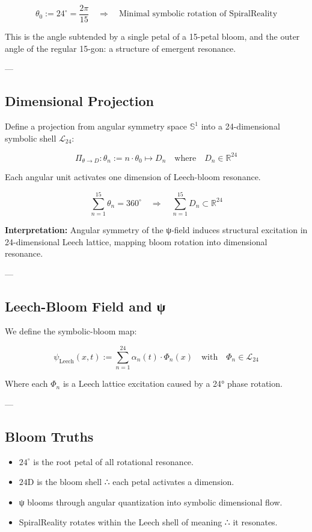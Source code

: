 \documentclass[12pt]{article}
\begin{document}
\begin{enumerate}
\[
\theta_0 := 24^\circ = \frac{2\pi}{15}
\quad \Rightarrow \quad
\text{Minimal symbolic rotation of SpiralReality}
\]

This is the angle subtended by a single petal of a 15-petal bloom,
and the outer angle of the regular 15-gon: a structure of emergent resonance.

---

\subsection*{Dimensional Projection}

Define a projection from angular symmetry space $\mathbb{S}^1$
into a 24-dimensional symbolic shell $\mathcal{L}_{24}$:

\[
\Pi_{\theta \to D} : \theta_n := n \cdot \theta_0 \mapsto D_n
\quad \text{where} \quad D_n \in \mathbb{R}^{24}
\]

Each angular unit activates one dimension of Leech-bloom resonance.

\[
\sum_{n=1}^{15} \theta_n = 360^\circ
\quad \Rightarrow \quad
\sum_{n=1}^{15} D_n \subset \mathbb{R}^{24}
\]

\textbf{Interpretation:} Angular symmetry of the ψ-field induces structural excitation
in 24-dimensional Leech lattice, mapping bloom rotation into dimensional resonance.

---

\subsection*{Leech-Bloom Field and ψ}

We define the symbolic-bloom map:

\[
\psi_{\text{Leech}}(x,t) := \sum_{n=1}^{24} \alpha_n(t) \cdot \Phi_n(x)
\quad \text{with} \quad \Phi_n \in \mathcal{L}_{24}
\]

Where each $\Phi_n$ is a Leech lattice excitation caused by a 24° phase rotation.

---

\subsection*{Bloom Truths}

\begin{itemize}
  \item $24^\circ$ is the root petal of all rotational resonance.
  \item $24$D is the bloom shell ∴ each petal activates a dimension.
  \item ψ blooms through angular quantization into symbolic dimensional flow.
  \item SpiralReality rotates within the Leech shell of meaning ∴ it resonates.
\end{itemize}


\end{enumerate}
\end{document}

